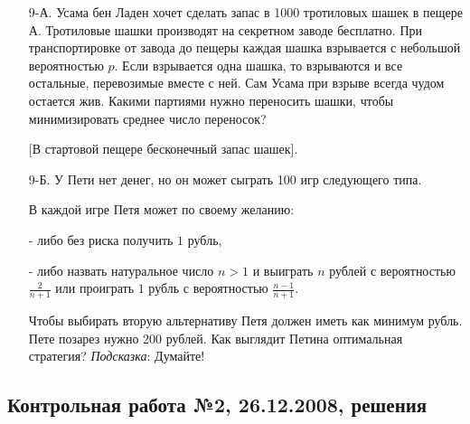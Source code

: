 \begin{enumerate}
\item[9-А.] Усама бен Ладен хочет сделать запас в 1000 тротиловых шашек в пещере А. Тротиловые шашки производят на секретном заводе бесплатно. При транспортировке от завода до пещеры каждая шашка взрывается с небольшой вероятностью $p$. Если взрывается одна шашка, то взрываются и все остальные, перевозимые вместе с ней. Сам Усама при взрыве всегда чудом остается жив. Какими партиями нужно переносить шашки, чтобы минимизировать среднее число переносок?

$[$В стартовой пещере бесконечный запас шашек$]$.

\item[9-Б.] У Пети нет денег, но он может сыграть 100 игр следующего типа.

В каждой игре Петя может по своему желанию:

- либо без риска получить $1$ рубль,

- либо назвать натуральное число $n>1$ и выиграть $n$ рублей с вероятностью $\frac{2}{n+1}$ или проиграть $1$ рубль с вероятностью $\frac{n-1}{n+1}$.

Чтобы выбирать вторую альтернативу Петя должен иметь как минимум рубль. Пете позарез нужно 200 рублей. Как выглядит Петина оптимальная стратегия?
\emph{Подсказка}: Думайте!
\end{enumerate}



\subsection{Контрольная работа №2, 26.12.2008, решения}

